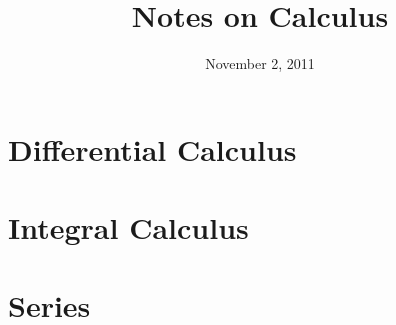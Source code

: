 \documentclass{article}
\title{Notes on Calculus}
\date{November 2, 2011}
\begin{document}
\maketitle
%
\tableofcontents
%
\part{Differential Calculus}

\part{Integral Calculus}


\part{Series}



\appendix


\end{document}
